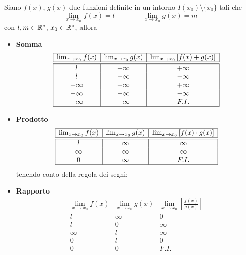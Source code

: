 \begin{shadedTheorem}
    Siano $f(x)$, $g(x)$ due funzioni definite in un intorno $I(x_0)\setminus \{x_0\}$ tali che
        \[\lim_{x\to x_0}f(x)=l\qquad \qquad \lim_{x\to x_0}g(x)=m\]
        con $l,m\in \mathbb{R}^\ast$, $x_0\in \mathbb{R}^\ast$, allora\\
        \begin{itemize}
            \item \textbf{Somma}
            \[\begin{array}{|c|c|c|}
                \hline
                \lim_{x\to x_0}f(x)& \lim_{x\to x_0}g(x)& \lim_{x\to x_0}\left[ f(x)+g(x) \right] \\ \hline\hline
                l & +\infty & +\infty\\
                l & -\infty & -\infty\\
                +\infty & +\infty & +\infty\\
                -\infty & -\infty & -\infty\\
                +\infty & -\infty & F. I. \\\hline
            \end{array}\]
            \item \textbf{Prodotto}
            \[\begin{array}{|c|c|c|}
                \hline
                \lim_{x\to x_0}f(x)& \lim_{x\to x_0}g(x)& \lim_{x\to x_0}\left[ f(x)\cdot g(x) \right] \\ \hline\hline
                l & \infty & \infty\\
                \infty & \infty & \infty\\
                0 & \infty & F. I. \\\hline
            \end{array}\]
            tenendo conto della regola dei segni;
            \item \textbf{Rapporto}
            \[\begin{array}{|c|c|c|}
                \hline
                \lim_{x\to x_0}f(x)& \lim_{x\to x_0}g(x)& \lim_{x\to x_0}\left[ \frac{f(x)}{g(x)} \right] \\ \hline\hline
                l & \infty & 0\\
                l &  0 &\infty \\
                \infty & l & \infty\\
                0 & l & 0\\
                0 & 0 & F. I. \\

\end{array}\]
\end{itemize}
\end{shadedTheorem}
